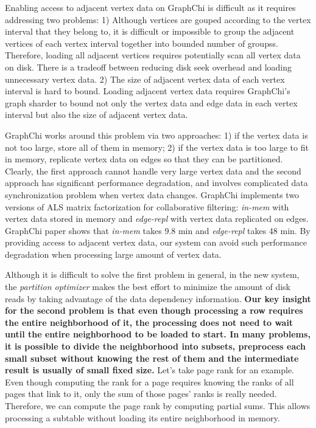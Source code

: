 \documentclass[10pt, twocolumn, a4paper]{article}
\begin{document}
\begin{enumerate}
Enabling access to adjacent vertex data on GraphChi is difficult as it requires addressing two problems: 1) Although vertices are gouped according to the vertex interval that they belong to, it is difficult or impossible to group the adjacent vertices of each vertex interval together into bounded number of groupss. Therefore, loading all adjacent vertices requires potentially scan all vertex data on disk. There is a tradeoff between reducing disk seek overhead and loading unnecessary vertex data. 2) The size of adjacent vertex data of each vertex interval is hard to bound. Loading adjacent vertex data requires GraphChi's graph sharder to bound not only the vertex data and edge data in each vertex interval but also the size of adjacent vertex data.

GraphChi works around this problem via two approaches: 1) if the vertex data is not too large, store all of them in memory; 2) if the vertex data is too large to fit in memory, replicate vertex data on edges so that they can be partitioned. Clearly, the first approach cannot handle very large vertex data and the second approach has significant performance degradation, and involves complicated data synchronization problem when vertex data changes. GraphChi implements two versions of ALS matrix factorization for collaborative filtering: \emph{in-mem} with vertex data stored in memory and \emph{edge-repl} with vertex data replicated on edges. GraphChi paper shows that \emph{in-mem} takes 9.8 min and \emph{edge-repl} takes 48 min. By providing access to adjacent vertex data, our system can avoid such performance degradation when processing large amount of vertex data.

Although it is difficult to solve the first problem in general, in the new system, the \emph{partition optimizer} makes the best effort to minimize the amount of disk reads by taking advantage of the data dependency information. \textbf{Our key insight for the second problem is that even though processing a row requires the entire neighborhood of it, the processing does not need to wait until the entire neighborhood to be loaded to start. In many problems, it is possible to divide the neighborhood into subsets, preprocess each small subset without knowing the rest of them and the intermediate result is usually of small fixed size.} Let's take page rank for an example. Even though computing the rank for a page requires knowing the ranks of all pages that link to it, only the sum of those pages' ranks is really needed. Therefore, we can compute the page rank by computing partial sums. This allows processing a subtable without loading its entire neighborhood in memory.


\end{enumerate}
\end{document}
